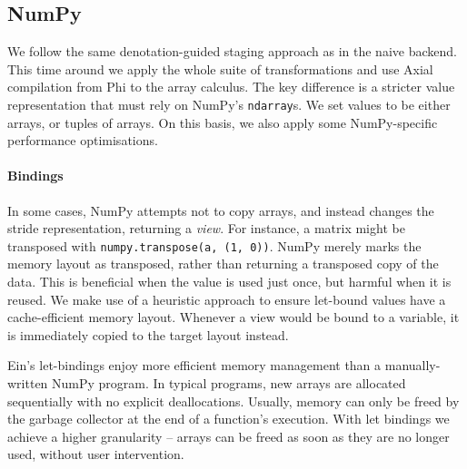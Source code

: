 \subsection{NumPy}

We follow the same denotation-guided staging approach as in the naive backend. This time around we apply the whole suite of transformations and use Axial compilation from Phi to the array calculus. The key difference is a stricter value representation that must rely on NumPy's \texttt{ndarray}s. We set values to be either arrays, or tuples of arrays. On this basis, we also apply some NumPy-specific performance optimisations.

\paragraph{Bindings} In some cases, NumPy attempts not to copy arrays, and instead changes the stride representation, returning a \textit{view}. For instance, a matrix might be transposed with \texttt{numpy.transpose(a, (1, 0))}. NumPy merely marks the memory layout as transposed, rather than returning a transposed copy of the data. This is beneficial when the value is used just once, but harmful when it is reused. We make use of a heuristic approach to ensure let-bound values have a cache-efficient memory layout. Whenever a view would be bound to a variable, it is immediately copied to the target layout instead. 

Ein's let-bindings enjoy more efficient memory management than a manually-written NumPy program. In typical programs, new arrays are allocated sequentially with no explicit deallocations. Usually, memory can only be freed by the garbage collector at the end of a function's execution. With let bindings we achieve a higher granularity -- arrays can be freed as soon as they are no longer used, without user intervention.

